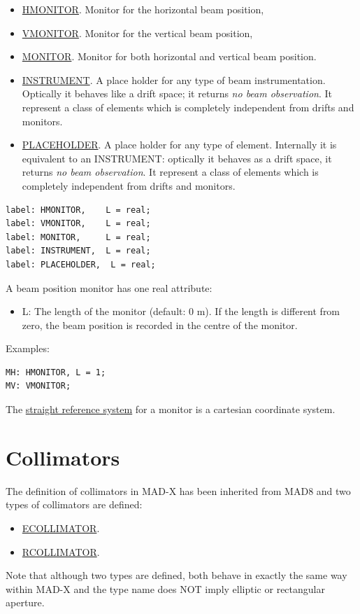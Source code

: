 \begin{itemize}
   \item \href{hmon}{HMONITOR}. Monitor for the horizontal beam position, 
   \item \href{vmon}{VMONITOR}. Monitor for the vertical beam position, 
   \item \href{mon}{MONITOR}. Monitor for both horizontal and vertical beam position. 
   \item \href{inst}{INSTRUMENT}. A place holder for any type of beam
     instrumentation. Optically it behaves like a drift space; it
     returns \emph{no beam observation}. It represent a class of
     elements which is completely independent from drifts and monitors.  
   \item \href{plac}{PLACEHOLDER}. A place holder for any type of
     element. Internally it is equivalent to an INSTRUMENT: optically it
     behaves as a drift space, it returns \emph{no beam observation}. It
     represent a class of elements which is completely independent from
     drifts and monitors. 
\end{itemize}

\begin{verbatim}
label: HMONITOR,    L = real;
label: VMONITOR,    L = real;
label: MONITOR,     L = real;
label: INSTRUMENT,  L = real;
label: PLACEHOLDER,  L = real;
\end{verbatim} 

A beam position monitor has one real attribute: 
\begin{itemize}
   \item L: The length of the monitor (default: 0 m). If the length is
     different from zero, the beam position is recorded in the centre of
     the monitor.  
\end{itemize} 

Examples: 
\begin{verbatim}
MH: HMONITOR, L = 1;
MV: VMONITOR;
\end{verbatim} 

The \href{local_system.html#straight}{straight reference system} for a
monitor is a cartesian coordinate system.  


%
\section{Collimators}
 
The definition of collimators in MAD-X has been inherited from MAD8 and two types of collimators are defined: 
\begin{itemize}
   \item \href{ecol}{ECOLLIMATOR}. 
   \item \href{rcol}{RCOLLIMATOR}. 
\end{itemize}  
Note that although two types are defined, both behave in exactly the
same way within MAD-X and the type name does NOT imply elliptic or
rectangular aperture.    

